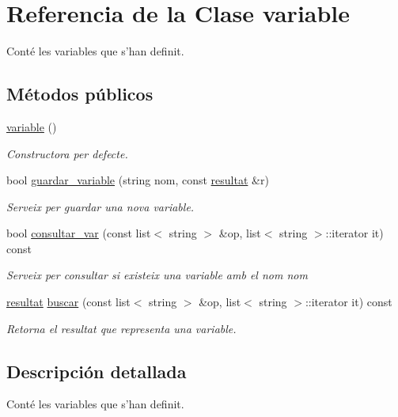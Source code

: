 \hypertarget{classvariable}{}\section{Referencia de la Clase variable}
\label{classvariable}


Conté les variables que s’han definit.  


\subsection*{Métodos públicos}
\begin{DoxyCompactItemize}
\item 
\hyperlink{classvariable_a424009148a020b406a8a5ecefa854edc}{variable} ()
\begin{DoxyCompactList}\small\item\em Constructora per defecte. \end{DoxyCompactList}\item 
bool \hyperlink{classvariable_ac8e2c3022d51e243b4c336c023300d28}{guardar\+\_\+variable} (string nom, const \hyperlink{classresultat}{resultat} \&r)
\begin{DoxyCompactList}\small\item\em Serveix per guardar una nova variable. \end{DoxyCompactList}\item 
bool \hyperlink{classvariable_a0b8c6b4971c4f88aa6554e72a76b23fc}{consultar\+\_\+var} (const list$<$ string $>$ \&op, list$<$ string $>$\+::iterator it) const
\begin{DoxyCompactList}\small\item\em Serveix per consultar si existeix una variable amb el nom {\itshape nom} \end{DoxyCompactList}\item 
\hyperlink{classresultat}{resultat} \hyperlink{classvariable_a1d4aa21d6874589f26ec2e7bf08d3e67}{buscar} (const list$<$ string $>$ \&op, list$<$ string $>$\+::iterator it) const
\begin{DoxyCompactList}\small\item\em Retorna el resultat que representa una variable. \end{DoxyCompactList}\end{DoxyCompactItemize}


\subsection{Descripción detallada}
Conté les variables que s’han definit. 

